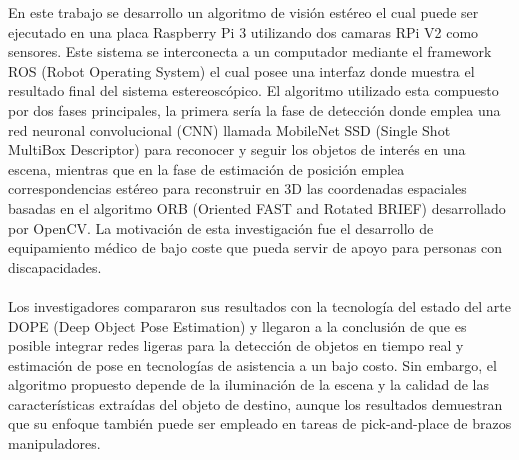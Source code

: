 En este trabajo se desarrollo un algoritmo de visión estéreo el cual puede ser ejecutado en una placa Raspberry Pi 3 utilizando dos camaras RPi V2 como sensores. Este sistema se interconecta a un computador mediante el framework ROS (Robot Operating System) el cual posee una interfaz donde muestra el resultado final del sistema estereoscópico. El algoritmo utilizado esta compuesto por dos fases principales, la primera sería la fase de detección donde emplea una red neuronal convolucional (CNN) llamada MobileNet SSD (Single Shot MultiBox Descriptor) para reconocer y seguir los objetos de interés en una escena, mientras que en la fase de estimación de posición emplea correspondencias estéreo para reconstruir en 3D las coordenadas espaciales basadas en el algoritmo ORB (Oriented FAST and Rotated BRIEF) desarrollado por OpenCV. La motivación de esta investigación fue el desarrollo de equipamiento médico de bajo coste que pueda servir de apoyo para personas con discapacidades.
\\
\\
Los investigadores compararon sus resultados con la tecnología del estado del arte DOPE (Deep Object Pose Estimation) y llegaron a la conclusión de que es posible integrar redes ligeras para la detección de objetos en tiempo real y estimación de pose en tecnologías de asistencia a un bajo costo. Sin embargo, el algoritmo propuesto depende de la iluminación de la escena y la calidad de las características extraídas del objeto de destino, aunque los resultados demuestran que su enfoque también puede ser empleado en tareas de pick-and-place de brazos manipuladores.
